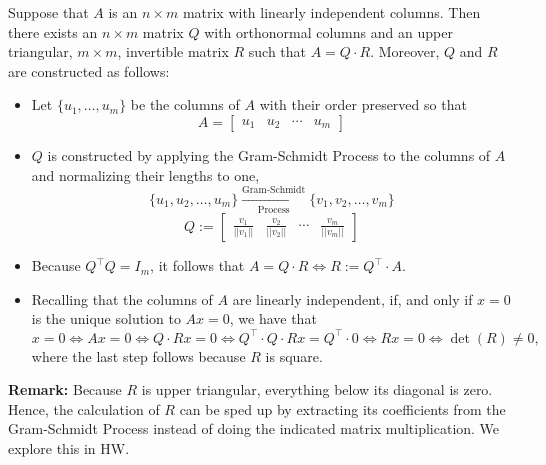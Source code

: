 \begin{tcolorbox}[sharp corners, colback=green!30, colframe=green!80!blue, title=\textbf{\Large QR Factorization}]
Suppose that $A$ is an $n \times m$ matrix with linearly independent columns. Then there exists an $n \times m$ matrix $Q$ with orthonormal columns and an upper triangular, $m \times m$, invertible matrix $R$ such that  $A=Q\cdot R$. Moreover, $Q$ and $R$ are constructed as follows:
\begin{itemize}
    \item Let $\{u_1, \ldots, u_m\}$ be the columns of $A$ with their order preserved so that 
    $$A=\left[ \begin{array}{cccc} u_1 & u_2 & \cdots& u_m \end{array} \right] $$
    \item $Q$ is constructed by applying the Gram-Schmidt Process to the columns of $A$ and normalizing their lengths to one,
    $$\{u_1, u_2, \ldots, u_m\} \xrightarrow[\text{Process}]{\text{Gram-Schmidt}} \{v_1, v_2, \ldots, v_m\}$$
 $$Q:=\left[ \begin{array}{cccc} \frac{v_1}{||v_1||} & \frac{v_2}{||v_2||} & \cdots& \frac{v_m}{||v_m||} \end{array} \right]  $$
 
 \item Because $Q^\top Q = I_m$, it follows that $A = Q \cdot R \iff R:=Q^\top \cdot A$. 
 
 \item Recalling that the columns of $A$ are linearly independent, if, and only if $x=0$ is the unique solution to $Ax=0$, we have that
 $$x=0 \iff Ax = 0 \iff Q \cdot R x = 0 \iff  Q^\top \cdot Q \cdot R x = Q^\top \cdot 0 \iff R x = 0 \iff \det(R) \neq 0,$$
 where the last step follows because $R$ is square.

\end{itemize}

\textbf{Remark:} Because $R$ is upper triangular, everything below its diagonal is zero. Hence, the calculation of $R$ can be sped up by extracting its coefficients from the Gram-Schmidt Process instead of doing the indicated matrix multiplication. We explore this in HW. 

\end{tcolorbox}

\vspace*{.2cm}

